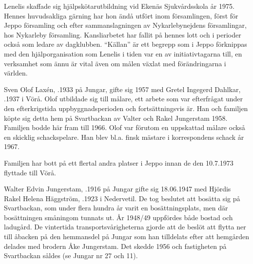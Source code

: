 Lenelis skaffade sig hjälpskötarutbildning vid Ekenäs Sjukvårdsskola år 1975. Hennes huvudsakliga gärning har hon ändå utfört inom församlingen, först för Jeppo församling och efter sammanslagningen av Nykarlebynejdens församlingar, hos Nykarleby församling.  Kansliarbetet har fallit på hennes lott och i perioder också som ledare av dagklubben. ``Källan'' är ett begrepp som i Jeppo förknippas med den hjälporganisation som Lenelis i tiden var en av initiativtagarna till, en verksamhet som ännu är vital även om målen växlat med förändringarna i världen.
\begin{jhchildren}
  \item {}
  \item {}
  \item {}
\end{jhchildren}


Sven Olof Laxén, .1933 på Jungar, gifte sig 1957 med Gretel Ingegerd Dahlkar, .1937 i Vörå. Olof utbildade sig till målare, ett arbete som var efterfrågat under den efterkrigstida uppbyggnadsperioden och fortsättningsvis är. Han och familjen köpte sig detta hem på Svartbackan av Valter och Rakel Jungerstam 1958. Familjen bodde här fram till 1966. Olof var förutom en uppskattad målare också en skicklig schackspelare. Han blev bl.a. finsk mästare i korrespondens schack år 1967.
\begin{jhchildren}
  \item {}
  \item {}
\end{jhchildren}
Familjen har bott på ett flertal andra platser i Jeppo innan de den 10.7.1973 flyttade till Vörå.


Walter Edvin Jungerstam, .1916 på Jungar gifte sig 18.06.1947 med Hjördis Rakel Helena Häggström, .1923 i Nedervetil. De tog beslutet att bosätta sig på Svartbackan, som under flera hundra år varit en bosättningsplats, men där bosättningen småningom tunnats ut. År 1948/49 uppfördes både bostad och ladugård. De vintertida
transportsvårigheterna gjorde att de beslöt att flytta ner till åbacken på den hemmansdel på Jungar som han tilldelats efter att hemgården delades med brodern Åke Jungerstam. Det skedde 1956 och fastigheten på Svartbackan såldes (se Jungar nr 27 och 11).



